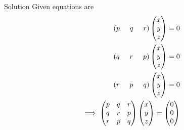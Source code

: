 \documentclass{beamer}
\numberwithin{equation}{section}
\providecommand{\brak}[1]{\ensuremath{\left(#1\right)}}
\theoremstyle{remark}
\newcommand{\myvec}[1]{\ensuremath{\begin{pmatrix}#1\end{pmatrix}}}
\begin{document}
\begin{frame}{Solution}
    Given equations are
\begin{align}
 \brak{p\hspace{0.5cm}q\hspace{0.5cm}r}\myvec{x\\y\\z}=0\\
   \brak{q\hspace{0.5cm}r\hspace{0.5cm}p}\myvec{x\\y\\z}=0\\
   \brak{r\hspace{0.5cm}p\hspace{0.5cm}q}\myvec{x\\y\\z}=0\\
   \implies \begin{pmatrix}
        p & q & r\\
        q & r & p\\
        r & p & q
    \end{pmatrix} \myvec{x\\y\\z} =\myvec{0\\0\\0}
\end{align}
\end{frame}
\end{document}
